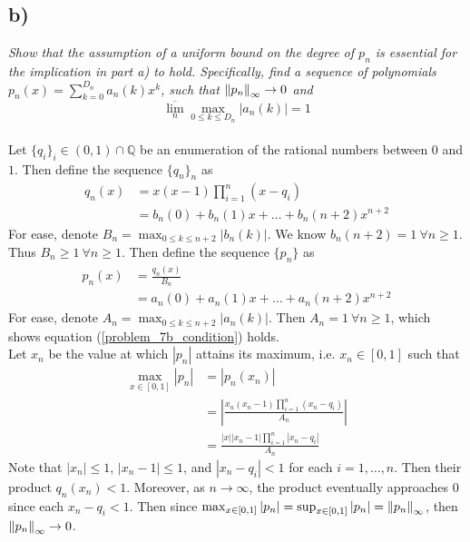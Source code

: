 \documentclass[12pt]{article}
\begin{document}
\subsection*{ b)}
{\it Show that the assumption of a uniform bound on the degree of $p_n$ is essential for the implication in part a) to hold.  Specifically, find a sequence of polynomials $p_n(x) = \sum_{k=0}^{D_n}a_n(k)x^k$, such that $\norm{p_n}_\infty \rightarrow 0$ and}
\begin{equation}
	\label{problem_7b_condition}
	\overline{\lim_n} \max_{0\leq k \leq D_n} |a_n(k)| = 1
\end{equation} \\

Let $\{q_i\}_i \in (0,1)\cap\mathbb{Q}$ be an enumeration of the rational numbers between $0$ and $1$.  Then define the sequence $\{q_n\}_n$ as
\begin{align*}
  q_n(x) &= x(x - 1)\prod\limits_{i=1}^{n}(x - q_i) \\
  &= b_n(0) + b_n(1) x + \dots + b_n(n+2)x^{n+2}
\end{align*}
For ease, denote $B_n = \max_{0\leq k\leq n+2}|b_n(k)|$.  We know $b_n(n+2) = 1\ \forall n \geq 1$.  Thus $B_n \geq 1\ \forall n \geq 1$.    Then define the sequence $\{p_n\}$ as
\begin{align*}
  p_n(x) &= \frac{q_n(x)}{B_n} \\
  &= a_n(0) + a_n(1) x + \dots + a_n(n+2)x^{n+2}
\end{align*}
For ease, denote $A_n = \max_{0\leq k\leq n+2}|a_n(k)|$.  Then $A_n = 1\ \forall n \geq 1$, which shows equation (\ref{problem_7b_condition}) holds.\\

Let $x_n$ be the value at which $|p_n|$ attains its maximum, i.e. $x_n \in [0,1]$ such that
\begin{align*}
  \max_{x\in[0,1]}|p_n| &= |p_n(x_n)| \\
  &= \left|\frac{x_n(x_n - 1)\prod_{i=1}^n(x_n - q_i)}{A_n}\right| \\
  &= \frac{|x||x_n - 1|\prod_{i=1}^n|x_n - q_i|}{A_n}
\end{align*}
Note that $|x_n| \leq 1$, $|x_n - 1| \leq 1$, and $|x_n - q_i| < 1$ for each $i = 1, \dots, n$.  Then their product $q_n(x_n) < 1$.  Moreover, as $n \rightarrow \infty$, the product eventually approaches $0$ since each $x_n - q_i < 1$.  Then since $\max_{x\in[0,1]}|p_n| = \sup_{x\in[0,1]}|p_n| = \norm{p_n}_\infty$, then $\norm{p_n}_\infty \rightarrow 0$.
\end{document}
